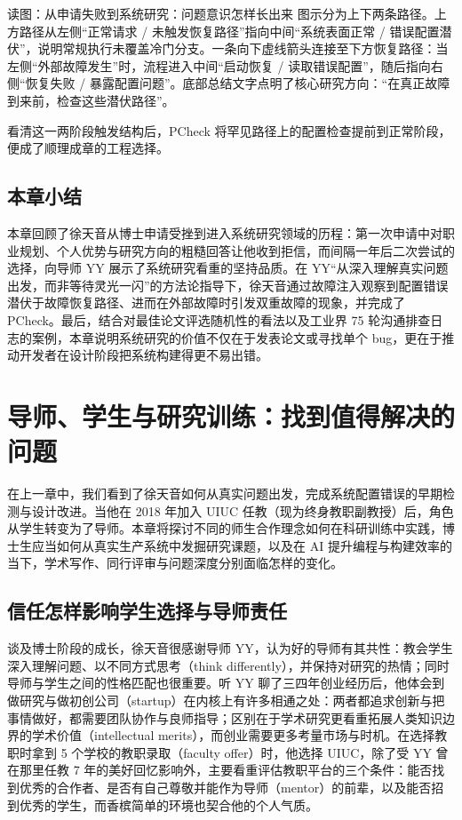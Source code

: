 \documentclass[UTF8,a4paper,11pt,fontset=fandol]{ctexart}
\begin{document}
\begin{knowledgebox}{读图：从申请失败到系统研究：问题意识怎样长出来}
图示分为上下两条路径。上方路径从左侧“正常请求 / 未触发恢复路径”指向中间“系统表面正常 / 错误配置潜伏”，说明常规执行未覆盖冷门分支。一条向下虚线箭头连接至下方恢复路径：当左侧“外部故障发生”时，流程进入中间“启动恢复 / 读取错误配置”，随后指向右侧“恢复失败 / 暴露配置问题”。底部总结文字点明了核心研究方向：“在真正故障到来前，检查这些潜伏路径”。
\end{knowledgebox}
看清这一两阶段触发结构后，PCheck 将罕见路径上的配置检查提前到正常阶段，便成了顺理成章的工程选择。
\subsection{本章小结}
本章回顾了徐天音从博士申请受挫到进入系统研究领域的历程：第一次申请中对职业规划、个人优势与研究方向的粗糙回答让他收到拒信，而间隔一年后二次尝试的选择，向导师 YY 展示了系统研究看重的坚持品质。在 YY“从深入理解真实问题出发，而非等待灵光一闪”的方法论指导下，徐天音通过故障注入观察到配置错误潜伏于故障恢复路径、进而在外部故障时引发双重故障的现象，并完成了 PCheck。最后，结合对最佳论文评选随机性的看法以及工业界 75 轮沟通排查日志的案例，本章说明系统研究的价值不仅在于发表论文或寻找单个 bug，更在于推动开发者在设计阶段把系统构建得更不易出错。
\section{导师、学生与研究训练：找到值得解决的问题}
在上一章中，我们看到了徐天音如何从真实问题出发，完成系统配置错误的早期检测与设计改进。当他在 2018 年加入 UIUC 任教（现为终身教职副教授）后，角色从学生转变为了导师。本章将探讨不同的师生合作理念如何在科研训练中实践，博士生应当如何从真实生产系统中发掘研究课题，以及在 AI 提升编程与构建效率的当下，学术写作、同行评审与问题深度分别面临怎样的变化。
\subsection{信任怎样影响学生选择与导师责任}
谈及博士阶段的成长，徐天音很感谢导师 YY，认为好的导师有其共性：教会学生深入理解问题、以不同方式思考（think differently），并保持对研究的热情；同时导师与学生之间的性格匹配也很重要。听 YY 聊了三四年创业经历后，他体会到做研究与做初创公司（startup）在内核上有许多相通之处：两者都追求创新与把事情做好，都需要团队协作与良师指导；区别在于学术研究更看重拓展人类知识边界的学术价值（intellectual merits），而创业需要更多考量市场与时机。在选择教职时拿到 5 个学校的教职录取（faculty offer）时，他选择 UIUC，除了受 YY 曾在那里任教 7 年的美好回忆影响外，主要看重评估教职平台的三个条件：能否找到优秀的合作者、是否有自己尊敬并能作为导师（mentor）的前辈，以及能否招到优秀的学生，而香槟简单的环境也契合他的个人气质。
\end{document}
